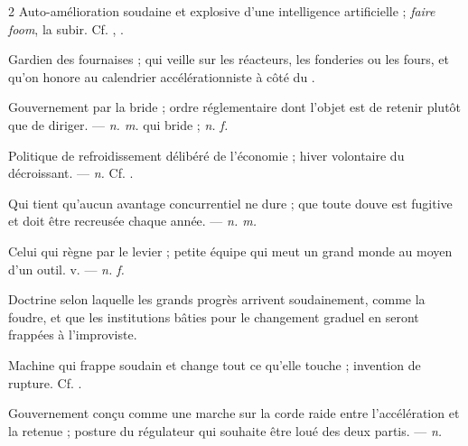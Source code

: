 \begin{multicols}{2}
  Auto-amélioration soudaine et explosive d'une intelligence artificielle ; \textit{faire foom}, la subir. Cf. , .

 Gardien des fournaises ; qui veille sur les réacteurs, les fonderies ou les fours, et qu'on honore au calendrier accélérationniste à côté du .

 Gouvernement par la bride ; ordre réglementaire dont l'objet est de retenir plutôt que de diriger. —  \textit{n. m.} qui bride ;  \textit{n. f.}

  Politique de refroidissement délibéré de l'économie ; hiver volontaire du décroissant.   —  \textit{n.} Cf. .

 Qui tient qu'aucun avantage concurrentiel ne dure ; que toute douve est fugitive et doit être recreusée chaque année.  —  \textit{n. m.}

 Celui qui règne par le levier ; petite équipe qui meut un grand monde au moyen d'un outil.   v. —  \textit{n. f.}

 Doctrine selon laquelle les grands progrès arrivent soudainement, comme la foudre, et que les institutions bâties pour le changement graduel en seront frappées à l'improviste.

 Machine qui frappe soudain et change tout ce qu'elle touche ; invention de rupture. Cf. .

 Gouvernement conçu comme une marche sur la corde raide entre l'accélération et la retenue ; posture du régulateur qui souhaite être loué des deux partis. —  \textit{n.}


\end{multicols}
